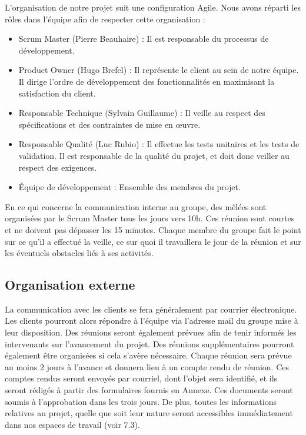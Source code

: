 \documentclass[10pt,a4paper]{article}
\begin{document}
L'organisation de notre projet suit une configuration Agile.
Nous avons réparti les rôles dans l'équipe afin de respecter cette organisation :
\begin{itemize}
\item Scrum Master (Pierre Beauhaire) : Il est responsable du processus de développement.
\item Product Owner (Hugo Brefel) : Il représente le client au sein de notre équipe. Il dirige l'ordre de développement des fonctionnalités en maximisant la satisfaction du client.
\item Responsable Technique (Sylvain Guillaume) : Il veille au respect des spécifications et des contraintes de mise en œuvre.
\item Responsable Qualité (Luc Rubio) : Il effectue les tests unitaires et les tests de validation. Il est responsable de la qualité du projet, et doit donc veiller au respect des exigences.
\item Équipe de développement : Ensemble des membres du projet.
\end{itemize}
En ce qui concerne la communication interne au groupe, des mêlées sont organisées par le Scrum Master tous les jours vers 10h. Ces réunion sont courtes et ne doivent pas dépasser les 15 minutes. Chaque membre du groupe fait le point sur ce qu'il a effectué la veille, ce sur quoi il travaillera le jour de la réunion et sur les éventuels obstacles liés à ses activités.


\subsection{Organisation externe}

La communication avec les clients se fera généralement par courrier électronique. Les clients pourront alors répondre à l’équipe via l’adresse mail du groupe mise à leur disposition. Des réunions seront également prévues afin de tenir informés les intervenants sur l’avancement du projet. Des réunions supplémentaires pourront également être organisées si cela s’avère nécessaire. Chaque réunion sera prévue au moins 2 jours à l’avance et donnera lieu à un compte rendu de réunion. Ces comptes rendus seront envoyés par courriel, dont l’objet sera identifié, et ils seront rédigés à partir des formulaires fournis en Annexe. Ces documents seront soumis à l’approbation dans les trois jours. De plus, toutes les informations relatives au projet, quelle que soit leur nature seront accessibles immédiatement dans nos espaces de travail (voir 7.3).
\end{document}
